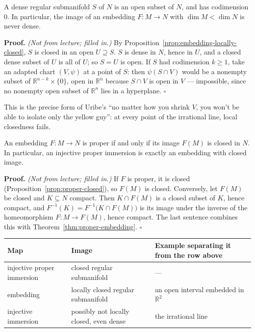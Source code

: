 \documentclass[11pt]{report}
\makeatletter
\newcounter{thmcounter}[section]
\renewenvironment{proof}[1][Proof]{\noindent\textbf{#1.} }{\hfill$\square$\par\vspace{5pt}}
\newcommand{\thmlabel}[1]{\edef\@currentlabel{\arabic{section}.\arabic{thmcounter}}\label{#1}}
\newcommand{\leeref}[1]{\par\smallskip{\raggedleft\footnotesize\textsc{Lee}:\ #1\par}}
\makeatother
\begin{document}
\begin{corbox}\thmlabel{cor:dense-submanifold}
A dense regular submanifold $S$ of $N$ is an open subset of $N$, and has codimension $0$. In particular, the image of an embedding $F : M \to N$ with $\dim M < \dim N$ is never dense.
\end{corbox}

\begin{proof}
\textit{(Not from lecture; filled in.)} By Proposition~\ref{prop:embedding-locally-closed}, $S$ is closed in an open $U \supseteq S$. $S$ is dense in $N$, hence in $U$, and a closed dense subset of $U$ is all of $U$; so $S = U$ is open. If $S$ had codimension $k \ge 1$, take an adapted chart $(V, \psi)$ at a point of $S$: then $\psi(S \cap V)$ would be a nonempty subset of $\mathbb{R}^{n-k} \times \{0\}$, open in $\mathbb{R}^n$ because $S \cap V$ is open in $V$ --- impossible, since no nonempty open subset of $\mathbb{R}^n$ lies in a hyperplane.
\end{proof}

This is the precise form of Uribe's ``no matter how you shrink $V$, you won't be able to isolate only the yellow guy'': at every point of the irrational line, local closedness fails.

\begin{propbox}\thmlabel{prop:proper-iff-closed}
An embedding $F : M \to N$ is proper if and only if its image $F(M)$ is closed in $N$. In particular, an injective proper immersion is exactly an embedding with closed image.
\leeref{Proposition 5.5}
\end{propbox}

\begin{proof}
\textit{(Not from lecture; filled in.)} If $F$ is proper, it is closed (Proposition~\ref{prop:proper-closed}), so $F(M)$ is closed. Conversely, let $F(M)$ be closed and $K \subseteq N$ compact. Then $K \cap F(M)$ is a closed subset of $K$, hence compact, and $F^{-1}(K) = F^{-1}\big(K \cap F(M)\big)$ is its image under the inverse of the homeomorphism $F : M \to F(M)$, hence compact. The last sentence combines this with Theorem~\ref{thm:proper-embedding}.
\end{proof}

\begin{center}
\renewcommand{\arraystretch}{1.3}
\begin{tabular}{p{} p{} p{}}
\hline
Map & Image & Example separating it from the row above \\
\hline
injective proper immersion & closed regular submanifold & --- \\
embedding & locally closed regular submanifold & an open interval embedded in $\mathbb{R}^2$ \\
injective immersion & possibly not locally closed, even dense & the irrational line \\
\hline
\end{tabular}
\end{center}
\end{document}
